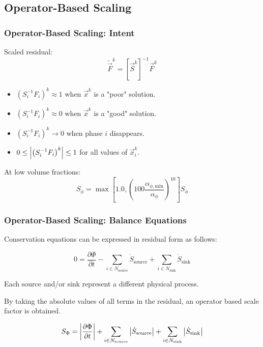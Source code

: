 \documentclass[compress,xcolor=table]{beamer}
\begin{document}
\subsection[Operator-Based Scaling]{Operator-Based Scaling}
\begin{frame}
\frametitle{Operator-Based Scaling: Intent}

Scaled residual:
\begin{equation*}
\tilde{\vec{F}}^{k} = \left[\vec{S}^{k}\right]^{-1}\vec{F}^{k}\end{equation*}

\begin{itemize}
\item{$\left( S_{i}^{-1} F_{i} \right)^{k} \approx 1$ when $\vec{x}^{k}$ is a "poor" solution.}
\item{$(S_{i}^{-1} F_i)^{k} \approx 0$ when $\vec{x}^{k}$ is a "good" solution.}
\item{$\left( S_{i}^{-1} F_{i} \right)^{k} \rightarrow 0$ when phase $i$ disappears.}
\item{$0 \leq \left| \left( S_{i}^{-1} F_{i} \right)^{k} \right| \leq 1 $ for all values of $\vec{x}^{k}_i$.}
\end{itemize}

At low volume fractions:
\begin{equation*}
S_{\phi} = \max\left[1.0, \left(100 \frac{\alpha_{\phi,\text{min}}}{\alpha_{\phi}}\right)^{10}\right] S_{\phi}
\end{equation*}

\end{frame}
\begin{frame}
\frametitle{Operator-Based Scaling: Balance Equations}
Conservation equations can be expressed in residual form as follows:

\begin{equation*}
0 = \frac{\partial \Phi}{\partial t} - \sum_{i \in N_{\text{source}}} \dot{S}_{\text{source}} + \sum_{i \in N_{\text{sink}}} \dot{S}_{\text{sink}}
\end{equation*}

Each source and/or sink represent a different physical process.

By taking the absolute values of all terms in the residual, an operator based scale factor is obtained.

\begin{equation*}
S_{\Phi} = \left|\frac{\partial \Phi}{\partial t}\right| + \sum_{i \in N_{\text{source}}} \left|\dot{S}_{\text{source}}\right| + \sum_{i \in N_{\text{sink}}} \left|\dot{S}_{\text{sink}}\right|
\end{equation*}


\end{frame}
\end{document}
